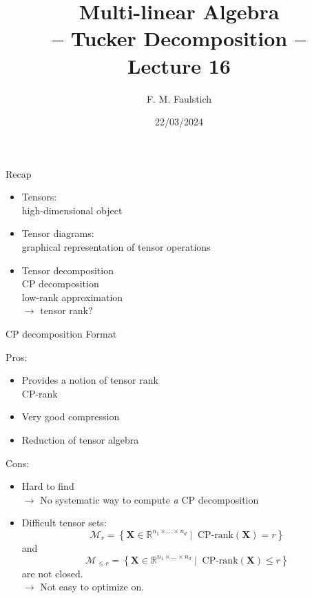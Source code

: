 \documentclass{beamer}
\title{
Multi-linear Algebra\\
-- Tucker Decomposition --\\
Lecture 16
}
\author{F. M. Faulstich}
\date{22/03/2024}
\newcommand{\bvec}[1]{\mathbf{#1}}
\newcommand{\vX}{\bvec{X}}
\newcommand{\bitem}{\item[$\bullet$]}
\begin{document}
\frame{\titlepage}

\begin{frame}{Recap}

\pause 

\begin{itemize}
    \bitem Tensors:\\
    high-dimensional object
    \bitem Tensor diagrams:\\
    graphical representation of tensor operations
    \bitem Tensor decomposition\\
    CP decomposition\\
    low-rank approximation\\
    $\rightarrow$ tensor rank?
\end{itemize}
    
\end{frame}

\begin{frame}{CP decomposition Format}

Pros:
\pause
\begin{itemize}
    \bitem Provides a notion of tensor rank\\
    CP-rank
    \bitem Very good compression
    \bitem Reduction of tensor algebra
\end{itemize}

Cons:
\pause
\begin{itemize}
    \bitem Hard to find\\
    $\rightarrow$ No systematic way to compute {\it a} CP decomposition
    \bitem Difficult tensor sets:
    \begin{equation*}
    \mathcal{M}_{r}
    =
    \left\lbrace
    \vX \in \mathbb{R}^{n_1 \times ... \times n_d}~|~
    \text{ CP-rank} (\vX) = r
    \right\rbrace
    \end{equation*}
    and 
    \begin{equation*}
    \mathcal{M}_{\leq r}
    =
    \left\lbrace
    \vX \in \mathbb{R}^{n_1 \times ... \times n_d}~|~
    \text{ CP-rank} (\vX) \leq r
    \right\rbrace
    \end{equation*}
    are not closed.\\
    $\rightarrow$ Not easy to optimize on. 
\end{itemize}

\end{frame}
\end{document}
